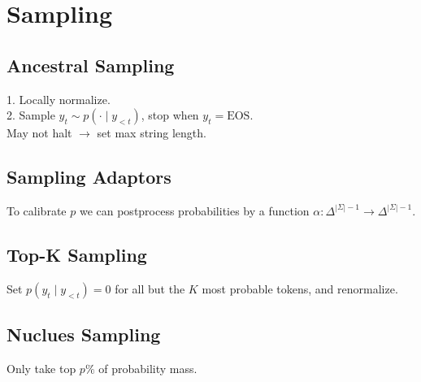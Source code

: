 \section{Sampling}
\subsection*{Ancestral Sampling}
1. Locally normalize.\\
2. Sample $y_t\sim p(\cdot\mid y_{<t})$, stop when $y_t=\text{EOS}$.
\\
May not halt $\rightarrow$ set max string length.

\subsection*{Sampling Adaptors}
To calibrate $p$ we can postprocess probabilities by a function $\alpha: \Delta^{|\Sigma|-1}\to \Delta^{|\Sigma|-1}$.

\subsection*{Top-K Sampling}
Set $p(y_t\mid y_{<t})=0$ for all but the $K$ most probable tokens, and renormalize.

\subsection*{Nuclues Sampling}
Only take top $p\%$ of probability mass.

